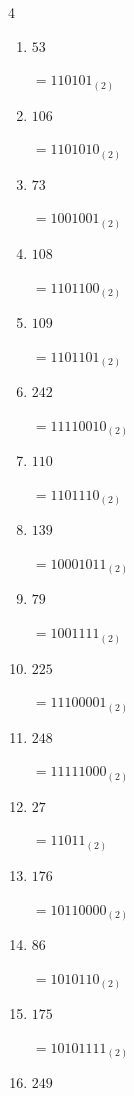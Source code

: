 \begin{multicols}{4}
\begin{enumerate}
        $=1100111_{(2)}$

  \item $53$

        $=110101_{(2)}$

  \item $106$

        $=1101010_{(2)}$

  \item $73$

        $=1001001_{(2)}$

  \item $108$

        $=1101100_{(2)}$

  \item $109$

        $=1101101_{(2)}$

  \item $242$

        $=11110010_{(2)}$

  \item $110$

        $=1101110_{(2)}$

  \item $139$

        $=10001011_{(2)}$

  \item $79$

        $=1001111_{(2)}$

  \item $225$

        $=11100001_{(2)}$

  \item $248$

        $=11111000_{(2)}$

\columnbreak %

  \item $27$

        $=11011_{(2)}$

  \item $176$

        $=10110000_{(2)}$

  \item $86$

        $=1010110_{(2)}$

  \item $175$

        $=10101111_{(2)}$

  \item $249$


\end{enumerate}
\end{multicols}
